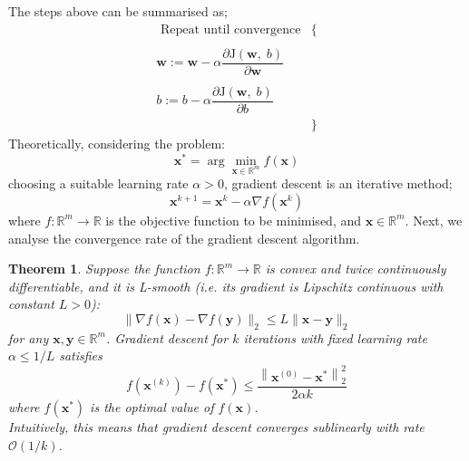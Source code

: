 \documentclass[12pt]{report}
\newtheorem{thm}{Theorem}[section]
\numberwithin{equation}{section}
\begin{document}
The steps above can be summarised as;
\[\begin{array}{rc}
\text{ Repeat until convergence} & \{  \\ 
 & \\
\bm{w}  :=  \bm{w} - \alpha \dfrac{\partial \mathrm{J}(\bm{w},\;b)}{\partial \bm{w}} & \\ \\
b  :=  b - \alpha \dfrac{\partial \mathrm{J}(\bm{w},\;b)}{\partial b} \\
& \}  
\end{array}\]
Theoretically, considering the problem:
\[
\bm{x}^{*}=\arg \min _{\bm{x} \in \mathbb{R}^{m}} f(\bm{x})
\]
choosing a suitable learning rate $\alpha > 0$, gradient descent is an iterative method;
\begin{equation}\label{eqn:gd}
\bm{x}^{k+1} = \bm{x}^k - \alpha \nabla f(\bm{x}^k)
\end{equation}
where $f:\mathbb{R}^m \rightarrow \mathbb{R}$ is the objective function to be minimised, and $\bm{x} \in \mathbb{R}^m$. Next, we analyse the convergence rate of the gradient descent algorithm. 

\begin{thm}\label{thm:gd_converge}
Suppose the function $f: \mathbb{R}^{m} \rightarrow \mathbb{R}$ is convex and twice continuously differentiable, and it is L-smooth (i.e. its gradient is Lipschitz continuous with constant $L>0$): 
\begin{equation}\label{eqn:lipschitz}
\|\nabla f(\bm{x})-\nabla f(\bm{y})\|_{2} \leq L\|\bm{x}-\bm{y}\|_{2}
\end{equation}
for any $\bm{x}, \bm{y}\in \mathbb{R}^m$. Gradient descent for $k$ iterations with  fixed learning rate $\alpha \leq 1 / L$  satisfies
\begin{equation}\label{eqn:sublinear_conv}
f\left(\bm{x}^{(k)}\right)-f\left(\bm{x}^{*}\right) \leq \frac{\left\|\bm{x}^{(0)}-\bm{x}^{*}\right\|_{2}^{2}}{2 \alpha k}
\end{equation}
where $f\left(\bm{x}^{*}\right)$ is the optimal value of $f(\bm{x})$. \\ Intuitively, this means that gradient descent converges sublinearly with rate $\mathcal{O}(1 / k)$. %
\end{thm}
\end{document}
